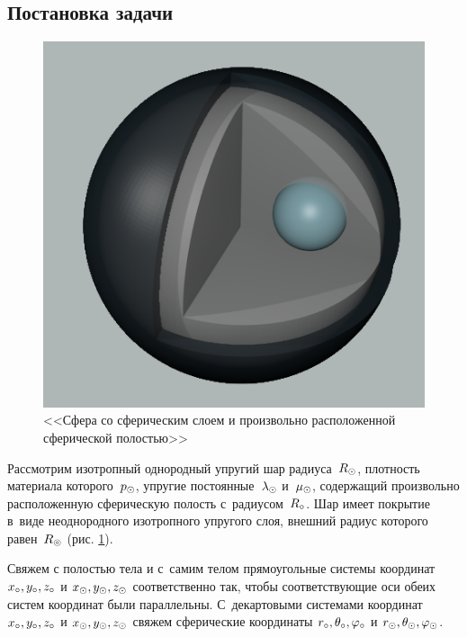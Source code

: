 \subsection{Постановка задачи}
\begin{figure}[h]
\begin{center}
\begin{minipage}[h]{0.47\linewidth}
\includegraphics[width=1\linewidth]{sphere_edited.png}
\caption{<<Сфера со сферическим слоем и произвольно расположенной сферической полостью>>}\label{pic_1}
\end{minipage}
\end{center}
\end{figure}

Рассмотрим изотропный однородный упругий шар радиуса~$R_\odot$, плотность материала которого~$p_\odot$, упругие постоянные~$\lambda_\odot$ и~$\mu_\odot$, содержащий произвольно расположенную сферическую полость с~радиусом~$R_\circ$. Шар имеет покрытие в~виде неоднородного изотропного упругого слоя, внешний радиус которого равен~$R_\circledcirc$ (рис. \cref{pic_1}).
 
Свяжем с полостью тела и с~самим телом прямоугольные системы координат $x_\circ, y_\circ, z_\circ$ и $x_\odot, y_\odot, z_\odot$ соответственно так, чтобы соответствующие оси обеих систем координат были параллельны. С~декартовыми системами координат $x_\circ, y_\circ, z_\circ$ и $x_\odot, y_\odot, z_\odot$ свяжем сферические координаты $r_\circ, \theta_\circ, \varphi_\circ$ и $r_\odot, \theta_\odot, \varphi_\odot$.


